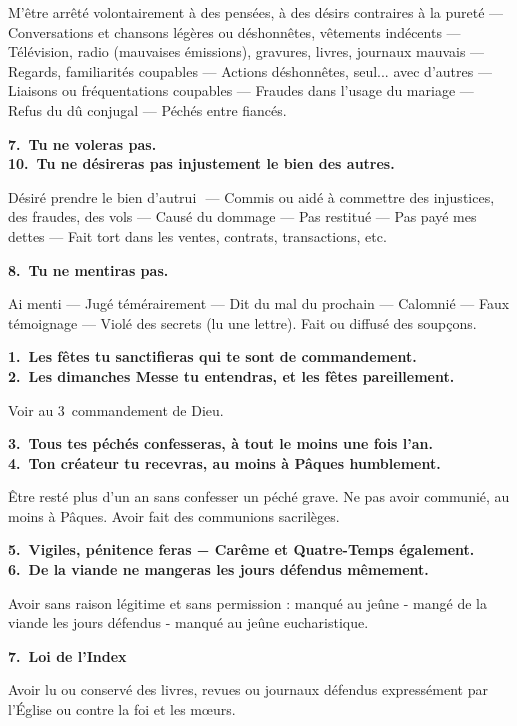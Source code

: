 \documentclass[%
a5paper%
,11pt%
,DIV=15%
,titlepage=on%
,headings=optiontoheadandtoc%
,headings=small%
,parskip=false%
,titlepage%
,openany%
]{scrbook}
\newcommand{\commandement}[1]{\noindent\textbf{#1}}
\begin{document}
M’être arrêté volontairement à des pensées, à des désirs contraires à la pureté
— Conversations et chansons légères ou
déshonnêtes, vêtements indécents — Télévision, radio (mauvaises émissions),
gravures, livres, journaux mauvais — Regards, familiarités coupables — Actions
déshonnêtes, seul... avec d’autres —
Liaisons ou fréquentations coupables —
Fraudes dans l’usage du mariage — Refus
du dû conjugal — Péchés entre fiancés.

\commandement{7. Tu ne voleras pas.\\
10. Tu ne désireras pas injustement le bien des autres.}

Désiré prendre le bien d’autrui ­ — Commis ou aidé à commettre des injustices,
des fraudes, des vols — Causé du dommage — Pas restitué — Pas payé mes dettes — Fait tort dans les ventes, contrats,
transactions, etc.

\commandement{8. Tu ne mentiras pas.}

Ai menti — Jugé témérairement — Dit
du mal du prochain — Calomnié — Faux
témoignage — Violé des secrets (lu une
lettre). Fait ou diffusé des soupçons.



\commandement{1. Les fêtes tu sanctifieras qui te sont de commandement.\\
2. Les dimanches Messe tu entendras, et les fêtes pareillement.}

Voir au 3\ieme\ commandement de Dieu.

\commandement{3. Tous tes péchés confesseras, à tout le moins une fois l’an.\\
4. Ton créateur tu recevras, au moins à Pâques humblement.}

Être resté plus d'un an sans confesser un péché grave. Ne pas avoir communié, au moins à Pâques. Avoir fait des communions sacrilèges.

\commandement{5. Vigiles, pénitence feras − Carême et Quatre-Temps également.\\
6. De la viande ne mangeras les jours défendus mêmement.}

Avoir sans raison légitime et sans permission : manqué au jeûne - mangé de la viande les jours défendus - manqué au
jeûne eucharistique.

\commandement{7. Loi de l'Index}

Avoir lu ou conservé des livres, revues ou journaux défendus expressément par l’Église ou contre la foi et les mœurs.


\end{document}
